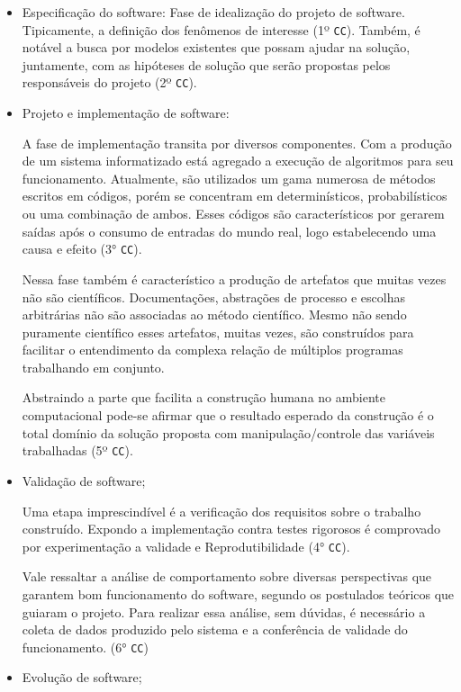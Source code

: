 \begin{itemize}
    \item Especificação do software: Fase de idealização do projeto de software. Tipicamente, a definição dos fenômenos de interesse (1º \texttt{CC}).
    Também, é notável a busca por modelos existentes que possam ajudar na solução, juntamente, com as hipóteses de solução que serão propostas pelos responsáveis do projeto (2º \texttt{CC}).
    \item Projeto e implementação de software:
    
    A fase de implementação transita por diversos componentes. Com a produção de um sistema informatizado está agregado a execução de algoritmos para seu funcionamento. Atualmente, são utilizados um gama numerosa de métodos escritos em códigos, porém se concentram em determinísticos, probabilísticos ou uma combinação de ambos. Esses códigos são característicos por gerarem saídas após o consumo de entradas do mundo real, logo estabelecendo uma causa e efeito (3° \texttt{CC}). 
    
    Nessa fase também é característico a produção de artefatos que muitas vezes não são científicos. Documentações, abstrações de processo e escolhas arbitrárias não são associadas ao método científico. Mesmo não sendo puramente científico esses artefatos, muitas vezes, são construídos para facilitar o entendimento da complexa relação de múltiplos programas trabalhando em conjunto.
    
    Abstraindo a parte que facilita a construção humana no ambiente computacional pode-se afirmar que o resultado esperado da construção é o total domínio da solução proposta com manipulação/controle das variáveis trabalhadas (5º \texttt{CC}). 
    
    \item Validação de software;
    
    Uma etapa imprescindível é a verificação dos requisitos sobre o trabalho construído. Expondo a implementação contra testes rigorosos é comprovado por experimentação a validade e \gls{Reprodutibilidade} (4° \texttt{CC}).
    
    Vale ressaltar a análise de comportamento sobre diversas perspectivas que garantem bom funcionamento do software, segundo os postulados teóricos que guiaram o projeto. Para realizar essa análise, sem dúvidas, é necessário a coleta de dados produzido pelo sistema e a conferência de validade do funcionamento. (6° \texttt{CC}) 
    
    \item Evolução de software;
    

\end{itemize}
